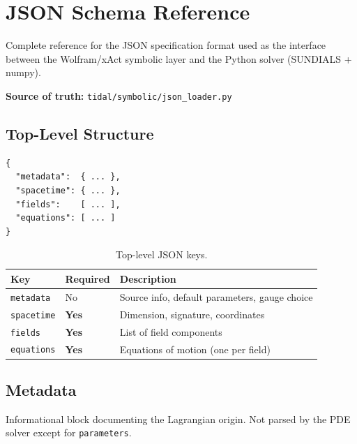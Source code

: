 
\section{JSON Schema Reference}
\label{sec:json-schema}

Complete reference for the JSON specification format used as the interface between the Wolfram/xAct symbolic layer and the Python solver (SUNDIALS + numpy).

\textbf{Source of truth:} \texttt{tidal/symbolic/json\_loader.py}


\subsection{Top-Level Structure}
\label{sec:json-top-level}

\begin{lstlisting}[style=json]
{
  "metadata":  { ... },
  "spacetime": { ... },
  "fields":    [ ... ],
  "equations": [ ... ]
}
\end{lstlisting}

\begin{table}[htbp]
\centering
\caption{Top-level JSON keys.}
\label{tab:json-top-level}
\begin{tabular}{@{}lll@{}}
\toprule
Key & Required & Description \\
\midrule
\texttt{metadata}  & No       & Source info, default parameters, gauge choice \\
\texttt{spacetime} & \textbf{Yes} & Dimension, signature, coordinates \\
\texttt{fields}    & \textbf{Yes} & List of field components \\
\texttt{equations} & \textbf{Yes} & Equations of motion (one per field) \\
\bottomrule
\end{tabular}
\end{table}


\subsection{Metadata}
\label{sec:json-metadata}

Informational block documenting the Lagrangian origin. Not parsed by the PDE solver except for \texttt{parameters}.

